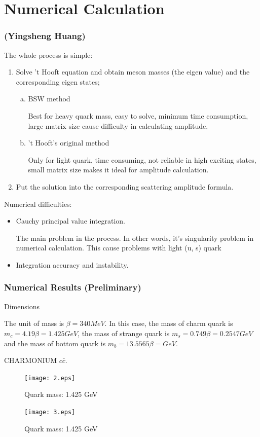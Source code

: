 \documentclass[8pt]{beamer}
\begin{document}
\section{Numerical Calculation}
\begin{frame}
	\frametitle{\insertsectionhead (Yingsheng Huang)}
	The whole process is simple:
	\begin{enumerate}
		\item Solve 't Hooft equation and obtain meson masses (the eigen value) and the corresponding eigen states;
		      \begin{enumerate}[(a)]
			      \item BSW method

			            Best for heavy quark mass, easy to solve, minimum time consumption, large matrix size cause difficulty in calculating amplitude.
			      \item 't Hooft's original method

			            Only for light quark, time consuming, not reliable in high exciting states, small matrix size makes it ideal for amplitude calculation.
		      \end{enumerate}
		\item Put the solution into the corresponding scattering amplitude formula.
	\end{enumerate}
	Numerical difficulties:
	\begin{itemize}
		\item Cauchy principal value integration.

		      The main problem in the process. In other words, it's singularity problem in numerical calculation. This cause problems with light (u, s) quark
		\item Integration accuracy and instability.
	\end{itemize}
\end{frame}

\begin{frame}
	\frametitle{Numerical Results (Preliminary)} 
	Dimensions

	The unit of mass is $\beta=340MeV$. In this case, the mass of charm quark is $m_c=4.19\beta=1.425GeV$, the mass of strange quark is $m_s=0.749\beta=0.2547GeV$ and the mass of bottom quark is $m_b=13.5565\beta=  GeV$.

	CHARMONIUM	$c\bar c$.



	\begin{minipage}{0.49\linewidth}
		\begin{figure}[H]
			\centering
			\texttt{[image: 2.eps]}
			\caption{Quark mass: 1.425 GeV}
			\label{fig:ccbar2}
		\end{figure}
	\end{minipage}
	\begin{minipage}{0.49\linewidth}
		\begin{figure}[H]
			\centering
			\texttt{[image: 3.eps]}
			\caption{Quark mass: 1.425 GeV}
			\label{fig:ccbar3}
		\end{figure}
	\end{minipage}

\end{frame}
\end{document}
